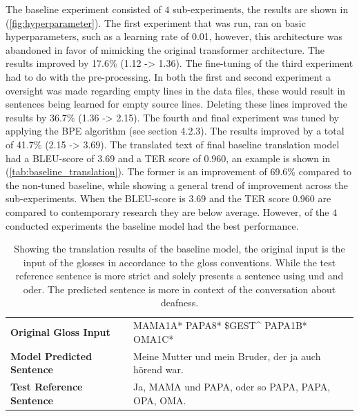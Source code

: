 The baseline experiment consisted of $4$ sub-experiments, the results are shown in (\autoref{fig:hyperparameter}). The first experiment that was run, ran on basic hyperparameters, such as a learning rate of 0.01, however, this architecture was abandoned in favor of mimicking the original transformer architecture. The results improved by 17.6\% (1.12 -> 1.36). The fine-tuning of the third experiment had to do with the pre-processing. In both the first and second experiment a oversight was made regarding empty lines in the data files, these would result in sentences being learned for empty source lines. Deleting these lines improved the results by 36.7\% (1.36 -> 2.15). The fourth and final experiment was tuned by applying the BPE algorithm \cite{gage1994new} (see section 4.2.3). The results improved by a total of 41.7\% (2.15 -> 3.69). The translated text of final baseline translation model had a BLEU-score of 3.69 and a TER score of 0.960, an example is shown in (\autoref{tab:baseline_translation}). The former is an improvement of 69.6\% compared to the non-tuned baseline, while showing a general trend of improvement across the sub-experiments. When the BLEU-score is 3.69 and the TER score 0.960 are compared to contemporary research they are below average.  However, of the $4$ conducted experiments the baseline model had the best performance.

\begin{table}[h]
\centering
\caption{Showing the translation results of the baseline model, the original input is the input of the glosses in accordance to the gloss conventions. While the test reference sentence is more strict and solely presents a sentence using und and oder. The predicted sentence is more in context of the conversation about deafness. }

\begin{tabular}{ll}
\textbf{Original Gloss Input}     & MAMA1A* PAPA8* \$GEST\textasciicircum{} PAPA1B* OMA1C* \\
\textbf{Model Predicted Sentence} & Meine Mutter und mein Bruder, der ja auch hörend war.                                                                                     \\
\textbf{Test Reference Sentence}  & Ja, MAMA und PAPA, oder so PAPA, PAPA, OPA, OMA.                                                                                         
\end{tabular}
\bottomrule
\label{tab:baseline_translation}
\end{table}


